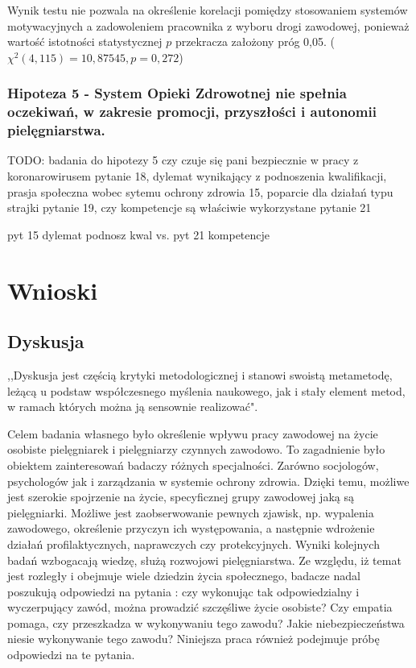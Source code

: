 \documentclass[a4paper,12pt,twoside,openany]{report}
\begin{document}
Wynik testu nie pozwala na określenie korelacji pomiędzy stosowaniem systemów motywacyjnych a zadowoleniem pracownika z wyboru drogi zawodowej, ponieważ wartość istotności statystycznej $p$ przekracza założony próg 0,05. ($\chi^2 (4, 115) = 10,87545, p=0,272$)

\vspace{\baselineskip} 

\subsection*{Hipoteza 5 - System Opieki Zdrowotnej nie spełnia oczekiwań, w zakresie promocji, przyszłości i autonomii pielęgniarstwa.}

\vspace{\baselineskip} 

TODO: badania do hipotezy 5
czy czuje się pani bezpiecznie w pracy z koronarowirusem pytanie 18, dylemat wynikający z podnoszenia kwalifikacji, prasja społeczna wobec sytemu ochrony zdrowia 15, poparcie dla działań typu strajki pytanie 19, czy kompetencje są właściwie wykorzystane pytanie 21



pyt 15 dylemat podnosz kwal vs. pyt 21 kompetencje
\vspace{\baselineskip} 


\chapter{Wnioski}


\section{Dyskusja}
,,Dyskusja jest częścią krytyki metodologicznej i stanowi swoistą metametodę, leżącą u podstaw współczesnego myślenia naukowego, jak i stały element metod, w ramach których można ją sensownie realizować"\cite{krytyka}.


Celem badania własnego było określenie wpływu pracy zawodowej na życie osobiste pielęgniarek i pielęgniarzy czynnych zawodowo. To zagadnienie było obiektem zainteresowań badaczy różnych specjalności. Zarówno socjologów, psychologów jak i zarządzania w systemie ochrony zdrowia.  Dzięki temu, możliwe jest szerokie spojrzenie na życie, specyficznej grupy zawodowej jaką są pielęgniarki. Możliwe jest zaobserwowanie pewnych zjawisk, np. wypalenia zawodowego, określenie przyczyn ich występowania, a następnie wdrożenie działań profilaktycznych, naprawczych czy protekcyjnych. Wyniki kolejnych badań wzbogacają wiedzę, służą rozwojowi pielęgniarstwa. Ze względu, iż temat jest rozległy i obejmuje wiele dziedzin życia społecznego, badacze nadal poszukują odpowiedzi na pytania : czy wykonując tak odpowiedzialny i wyczerpujący zawód, można prowadzić szczęśliwe życie osobiste? Czy empatia pomaga, czy przeszkadza w wykonywaniu tego zawodu? Jakie niebezpieczeństwa niesie wykonywanie tego zawodu? Niniejsza praca również podejmuje próbę odpowiedzi na te pytania.
\end{document}
